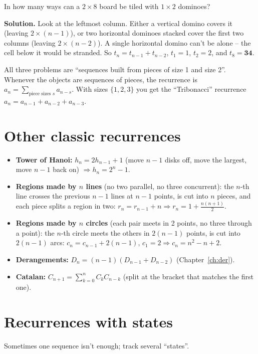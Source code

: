 \documentclass[11pt,a4paper,openany]{report}
\begin{document}
\begin{example}
In how many ways can a $2\times 8$ board be tiled with $1\times2$ dominoes?

\textbf{Solution.} Look at the leftmost column. Either a vertical domino covers it (leaving $2\times(n-1)$),
or two horizontal dominoes stacked cover the first two columns (leaving $2\times(n-2)$). A single horizontal
domino can't be alone -- the cell below it would be stranded. So $t_n=t_{n-1}+t_{n-2}$, $t_1=1$, $t_2=2$, and
$t_8=\mathbf{34}$.
\end{example}

\begin{why}
All three problems are ``sequences built from pieces of size 1 and size 2''. Whenever the objects are
sequences of pieces, the recurrence is $a_n=\sum_{\text{piece sizes } s} a_{n-s}$. With sizes $\{1,2,3\}$
you get the ``Tribonacci'' recurrence $a_n=a_{n-1}+a_{n-2}+a_{n-3}$.
\end{why}

\section{Other classic recurrences}
\begin{itemize}
\item \textbf{Tower of Hanoi:} $h_n=2h_{n-1}+1$ (move $n-1$ disks off, move the largest, move $n-1$ back on) $\Rightarrow h_n=2^n-1$.
\item \textbf{Regions made by $n$ lines} (no two parallel, no three concurrent): the $n$-th line crosses the
previous $n-1$ lines at $n-1$ points, is cut into $n$ pieces, and each piece splits a region in two:
$r_n=r_{n-1}+n \Rightarrow r_n=1+\frac{n(n+1)}2$.
\item \textbf{Regions made by $n$ circles} (each pair meets in 2 points, no three through a point): the $n$-th circle meets the
others in $2(n-1)$ points, is cut into $2(n-1)$ arcs: $c_n=c_{n-1}+2(n-1)$, $c_1=2 \Rightarrow c_n=n^2-n+2$.
\item \textbf{Derangements:} $D_n=(n-1)(D_{n-1}+D_{n-2})$ (Chapter~\ref{ch:der}).
\item \textbf{Catalan:} $C_{n+1}=\sum_{k=0}^{n}C_kC_{n-k}$ (split at the bracket that matches the first one).
\end{itemize}

\section{Recurrences with states}
Sometimes one sequence isn't enough; track several ``states''.
\end{document}

